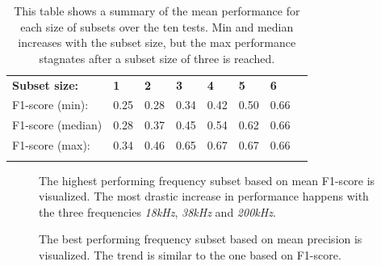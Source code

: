 \begin{longtable}{llllllll}
\caption{This table shows a summary of the mean performance for each size of subsets over the ten tests. Min and median increases with the subset size, but the max performance stagnates after a subset size of three is reached. }\\
                  &      &      &      &      &      &      &  \\ \hline
\endfirsthead
%
\endhead
%
\hline
\endfoot
%
\endlastfoot
%
\textbf{Subset size:}      & \textbf{1}    & \textbf{2}    & \textbf{3}    & \textbf{4}    & \textbf{5}    & \textbf{6}    &  \\ \hline
F1-score (min):   & 0.25 & 0.28 & 0.34 & 0.42 & 0.50 & 0.66 &  \\
F1-score (median) & 0.28 & 0.37 & 0.45 & 0.54 & 0.62 & 0.66 &  \\
F1-score (max):   & 0.34 & 0.46 & 0.65 & 0.67 & 0.67 & 0.66 &  \\ \hline
\label{summary_per_subset_size_table}

\end{longtable}
    
        
        \begin{figure}[H]
            \centering
            
            \caption[Best frequency combination - F1-score]{The highest performing frequency subset based on mean F1-score is visualized. The most drastic increase in performance happens with the three frequencies \textit{18kHz}, \textit{38kHz} and \textit{200kHz}.}
          	\medskip 
            \label{increasing_freq_f1_score_fig}
        \end{figure}

        \clearpage
        \begin{figure}[H]
            \centering
            
            \caption[Best frequency combination - Precision]{The best performing frequency subset based on mean precision is visualized. The trend is similar to the one based on F1-score.}
          	\medskip 
            \label{increasing_freq_precision_score_fig}
        \end{figure}
        

